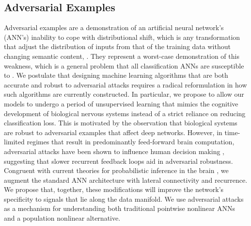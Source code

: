 \subsection{Adversarial Examples}
Adversarial examples are a demonstration of an artificial neural network's (ANN’s) inability to cope with distributional shift, which is any transformation that adjust the distribution of inputs from that of the training data without changing semantic content, \parencite{ford2019adversarial}.
They represent a worst-case demonstration of this weakness, which is a general problem that all classification ANNs are susceptible to \parencite{hendrycks2018benchmarking}.
We postulate that designing machine learning algorithms that are both accurate and robust to adversarial attacks requires a radical reformulation in how such algorithms are currently constructed.
In particular, we propose to allow our models to undergo a period of unsupervised learning that mimics the cognitive development of biological nervous systems instead of a strict reliance on reducing classification loss.
This is motivated by the observation that biological systems are robust to adversarial examples that affect deep networks.
However, in time-limited regimes that result in predominantly feed-forward brain computation, adversarial attacks have been shown to influence human decision making \parencite{elsayed2018adversarial}, suggesting that slower recurrent feedback loops aid in adversarial robustness.
Congruent with current theories for probabilistic inference in the brain \parencite{lee2003hierarchical}, we augment the standard ANN architecture with lateral connectivity and recurrence.
We propose that, together, these modifications will improve the network’s specificity to signals that lie along the data manifold.
We use adversarial attacks as a mechanism for understanding both traditional pointwise nonlinear ANNs and a population nonlinear alternative.

